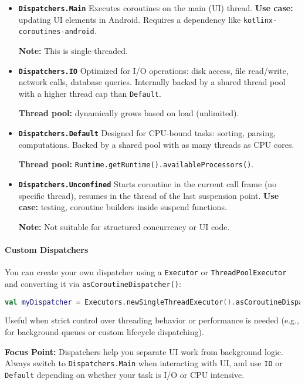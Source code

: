 \documentclass[a4paper,12pt]{article}
\begin{document}
\begin{itemize}
  \item \textbf{\texttt{Dispatchers.Main}}  
  Executes coroutines on the main (UI) thread.  
  \textbf{Use case:} updating UI elements in Android.  
  Requires a dependency like \texttt{kotlinx-coroutines-android}.

  \textbf{Note:} This is single-threaded.

  \item \textbf{\texttt{Dispatchers.IO}}  
  Optimized for I/O operations: disk access, file read/write, network calls, database queries.  
  Internally backed by a shared thread pool with a higher thread cap than \texttt{Default}.

  \textbf{Thread pool:} dynamically grows based on load (unlimited).

  \item \textbf{\texttt{Dispatchers.Default}}  
  Designed for CPU-bound tasks: sorting, parsing, computations.  
  Backed by a shared pool with as many threads as CPU cores.

  \textbf{Thread pool:} \texttt{Runtime.getRuntime().availableProcessors()}.

  \item \textbf{\texttt{Dispatchers.Unconfined}}  
  Starts coroutine in the current call frame (no specific thread), resumes in the thread of the last suspension point.  
  \textbf{Use case:} testing, coroutine builders inside suspend functions.  

  \textbf{Note:} Not suitable for structured concurrency or UI code.

\end{itemize}

\paragraph{Custom Dispatchers}
You can create your own dispatcher using a \texttt{Executor} or \texttt{ThreadPoolExecutor} and converting it via \texttt{asCoroutineDispatcher()}:

\begin{lstlisting}[language=Kotlin]
val myDispatcher = Executors.newSingleThreadExecutor().asCoroutineDispatcher()
\end{lstlisting}

Useful when strict control over threading behavior or performance is needed (e.g., for background queues or custom lifecycle dispatching).

\textbf{Focus Point:}  
Dispatchers help you separate UI work from background logic. Always switch to \texttt{Dispatchers.Main} when interacting with UI, and use \texttt{IO} or \texttt{Default} depending on whether your task is I/O or CPU intensive.
\end{document}
